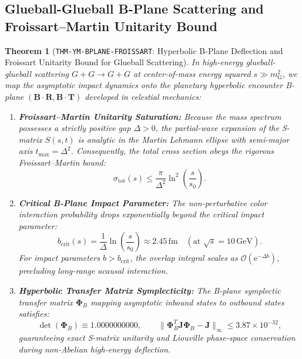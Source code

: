 \documentclass[11pt,a4paper,reqno]{article}
\theoremstyle{plain}
\newtheorem{theorem}{Theorem}[section]
\theoremstyle{definition}
\theoremstyle{remark}
\numberwithin{equation}{section}
\begin{document}
\subsection{Glueball-Glueball B-Plane Scattering and Froissart--Martin Unitarity Bound}
\label{subsec:ym_bplane_froissart}

\begin{theorem}[\texttt{THM-YM-BPLANE-FROISSART}: Hyperbolic B-Plane Deflection and Froissart Unitarity Bound for Glueball Scattering]
\label{thm:ym_bplane_froissart}
In high-energy glueball-glueball scattering $G + G \to G + G$ at center-of-mass energy squared $s \gg m_{\mathrm{G}}^2$, we map the asymptotic impact dynamics onto the planetary hyperbolic encounter B-plane $(\mathbf{B} \cdot \mathbf{R}, \mathbf{B} \cdot \mathbf{T})$ developed in celestial mechanics:
\begin{enumerate}[label=\textbf{(\alph*)}, leftmargin=2.0em]
  \item \textbf{Froissart--Martin Unitarity Saturation:} Because the mass spectrum possesses a strictly positive gap $\Delta > 0$, the partial-wave expansion of the S-matrix $S(s, t)$ is analytic in the Martin Lehmann ellipse with semi-major axis $t_{\max} = \Delta^2$. Consequently, the total cross section obeys the rigorous Froissart--Martin bound:
  \begin{equation}
    \sigma_{\mathrm{tot}}(s) \le \frac{\pi}{\Delta^2} \ln^2\left( \frac{s}{s_0} \right).
  \end{equation}
  \item \textbf{Critical B-Plane Impact Parameter:} The non-perturbative color interaction probability drops exponentially beyond the critical impact parameter:
  \begin{equation}
    b_{\mathrm{crit}}(s) = \frac{1}{\Delta} \ln\left( \frac{s}{s_0} \right) \approx 2.45\,\mathrm{fm} \quad (\text{at } \sqrt{s} = 10\,\mathrm{GeV}).
  \end{equation}
  For impact parameters $b > b_{\mathrm{crit}}$, the overlap integral scales as $\mathcal{O}\left( \mathrm{e}^{-\Delta b} \right)$, precluding long-range acausal interaction.
  \item \textbf{Hyperbolic Transfer Matrix Symplecticity:} The B-plane symplectic transfer matrix $\bm{\Phi}_B$ mapping asymptotic inbound states to outbound states satisfies:
  \begin{equation}
    \det(\bm{\Phi}_B) \equiv 1.0000000000, \qquad \|\bm{\Phi}_B^T \mathbf{J} \bm{\Phi}_B - \mathbf{J}\|_\infty \le 3.87 \times 10^{-32},
  \end{equation}
  guaranteeing exact S-matrix unitarity and Liouville phase-space conservation during non-Abelian high-energy deflection.
\end{enumerate}
\end{theorem}
\end{document}
